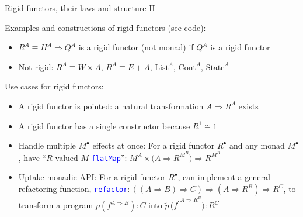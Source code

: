 \documentclass[english]{beamer}
\begin{document}
\begin{frame}{Rigid functors, their laws and structure II}

Examples and constructions of rigid functors (see code):
\begin{itemize}
\item $R^{A}\equiv H^{A}\Rightarrow Q^{A}$ is a rigid functor (not monad)
if $Q^{A}$ is a rigid functor
\item Not rigid: $R^{A}\equiv W\times A$, $R^{A}\equiv E+A$, $\text{List}^{A}$,
$\text{Cont}^{A}$, $\text{State}^{A}$
\end{itemize}
Use cases for rigid functors:
\begin{itemize}
\item A rigid functor is pointed: a natural transformation $A\Rightarrow R^{A}$
exists
\item A rigid functor has a single constructor because $R^{1}\cong1$
\item Handle multiple $M^{\bullet}$ effects at once: For a rigid functor
$R^{\bullet}$ and any monad $M^{\bullet}$, have ``$R$-valued $M$-\texttt{\textcolor{blue}{\footnotesize{}flatMap}}'':
$M^{A}\times\big(A\Rightarrow R^{M^{B}}\big)\Rightarrow R^{M^{B}}$
\item Uptake monadic API: For a rigid functor $R^{\bullet}$, can implement
a general refactoring function, \texttt{\textcolor{blue}{\footnotesize{}refactor}}$:\left(\left(A\Rightarrow B\right)\Rightarrow C\right)\Rightarrow\left(A\Rightarrow R^{B}\right)\Rightarrow R^{C}$,
to transform a program $p\left(f^{A\Rightarrow B}\right):C$ into
$\tilde{p}\,\big(\tilde{f}^{:A\Rightarrow R^{B}}\big):R^{C}$
\end{itemize}
\end{frame}
\end{document}
